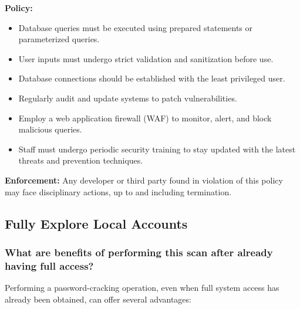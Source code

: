 \textbf{Policy:}
\begin{itemize}
      \item Database queries must be executed using prepared statements or parameterized queries.
      \item User inputs must undergo strict validation and sanitization before use.
      \item Database connections should be established with the least privileged user.
      \item Regularly audit and update systems to patch vulnerabilities.
      \item Employ a web application firewall (WAF) to monitor, alert, and block malicious queries.
      \item Staff must undergo periodic security training to stay updated with the latest threats and prevention techniques.
\end{itemize}

\textbf{Enforcement:}
Any developer or third party found in violation of this policy may face disciplinary actions, up to and including termination.

\subsection{Fully Explore Local Accounts}

\subsubsection{What are benefits of performing this scan after already having full access?}
Performing a password-cracking operation, even when full system access has already been obtained, can offer several advantages:

